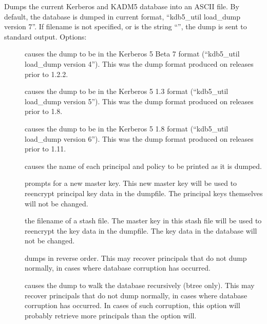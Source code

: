 \documentclass[letterpaper,10pt,english]{sphinxmanual}
\begin{document}
\sphinxAtStartPar
Dumps the current Kerberos and KADM5 database into an ASCII file.  By
default, the database is dumped in current format, “kdb5\_util
load\_dump version 7”.  If filename is not specified, or is the string
“\sphinxhyphen{}”, the dump is sent to standard output.  Options:
\begin{description}
\item[{}] \leavevmode
\sphinxAtStartPar
causes the dump to be in the Kerberos 5 Beta 7 format (“kdb5\_util
load\_dump version 4”).  This was the dump format produced on
releases prior to 1.2.2.

\item[{}] \leavevmode
\sphinxAtStartPar
causes the dump to be in the Kerberos 5 1.3 format (“kdb5\_util
load\_dump version 5”).  This was the dump format produced on
releases prior to 1.8.

\item[{}] \leavevmode
\sphinxAtStartPar
causes the dump to be in the Kerberos 5 1.8 format (“kdb5\_util
load\_dump version 6”).  This was the dump format produced on
releases prior to 1.11.

\item[{}] \leavevmode
\sphinxAtStartPar
causes the name of each principal and policy to be printed as it
is dumped.

\item[{}] \leavevmode
\sphinxAtStartPar
prompts for a new master key.  This new master key will be used to
re\sphinxhyphen{}encrypt principal key data in the dumpfile.  The principal keys
themselves will not be changed.

\item[{ }] \leavevmode
\sphinxAtStartPar
the filename of a stash file.  The master key in this stash file
will be used to re\sphinxhyphen{}encrypt the key data in the dumpfile.  The key
data in the database will not be changed.

\item[{}] \leavevmode
\sphinxAtStartPar
dumps in reverse order.  This may recover principals that do not
dump normally, in cases where database corruption has occurred.

\item[{}] \leavevmode
\sphinxAtStartPar
causes the dump to walk the database recursively (btree only).
This may recover principals that do not dump normally, in cases
where database corruption has occurred.  In cases of such
corruption, this option will probably retrieve more principals
than the  option will.


\end{description}
\end{document}
